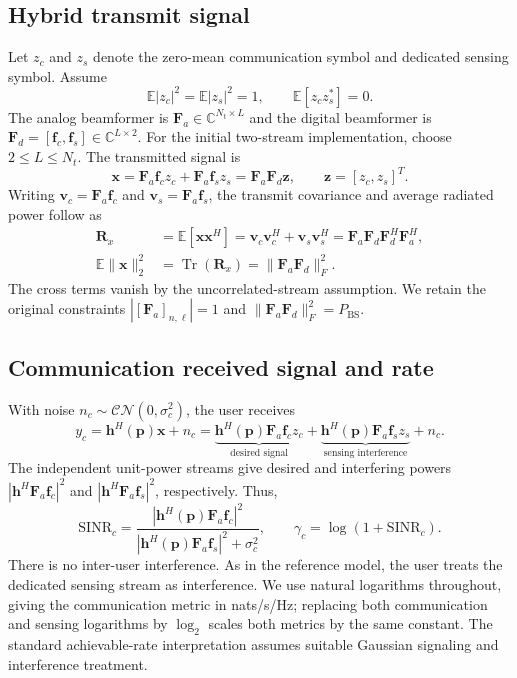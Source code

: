 \documentclass[11pt]{article}
\newcommand{\Fa}{\mathbf F_a}
\newcommand{\Fd}{\mathbf F_d}
\newcommand{\pos}{\mathbf p}
\begin{document}
\subsection{Hybrid transmit signal}
Let $z_c$ and $z_s$ denote the zero-mean communication symbol and dedicated
sensing symbol. Assume
\begin{equation}
 \mathbb E|z_c|^2=\mathbb E|z_s|^2=1,
 \qquad \mathbb E[z_cz_s^*]=0.
\end{equation}
The analog beamformer is $\Fa\in\mathbb C^{N_t\times L}$ and the digital
beamformer is $\Fd=[\mathbf f_c,\mathbf f_s]\in\mathbb C^{L\times2}$.
For the initial two-stream implementation, choose $2\leq L\leq N_t$.
The transmitted signal is
\begin{equation}
 \mathbf x=\Fa\mathbf f_cz_c+\Fa\mathbf f_sz_s
 =\Fa\Fd\mathbf z,\qquad \mathbf z=[z_c,z_s]^T.
 \label{eq:transmit}
\end{equation}
Writing $\mathbf v_c=\Fa\mathbf f_c$ and $\mathbf v_s=\Fa\mathbf f_s$,
the transmit covariance and average radiated power follow as
\begin{align}
 \mathbf R_x&=\mathbb E[\mathbf x\mathbf x^H]
 =\mathbf v_c\mathbf v_c^H+\mathbf v_s\mathbf v_s^H
 =\Fa\Fd\Fd^H\Fa^H,\label{eq:covariance}\\
 \mathbb E\|\mathbf x\|_2^2
 &=\operatorname{Tr}(\mathbf R_x)=\|\Fa\Fd\|_F^2.
 \label{eq:power}
\end{align}
The cross terms vanish by the uncorrelated-stream assumption. We retain the
original constraints $|[\Fa]_{n,\ell}|=1$ and
$\|\Fa\Fd\|_F^2=P_{\mathrm{BS}}$.

\subsection{Communication received signal and rate}
With noise $n_c\sim\mathcal{CN}(0,\sigma_c^2)$, the user receives
\begin{equation}
 y_c=\mathbf h^H(\pos)\mathbf x+n_c
 =\underbrace{\mathbf h^H(\pos)\Fa\mathbf f_cz_c}_{\text{desired signal}}
 +\underbrace{\mathbf h^H(\pos)\Fa\mathbf f_sz_s}_{\text{sensing interference}}
 +n_c.
 \label{eq:commreceived}
\end{equation}
The independent unit-power streams give desired and interfering powers
$|\mathbf h^H\Fa\mathbf f_c|^2$ and $|\mathbf h^H\Fa\mathbf f_s|^2$,
respectively. Thus,
\begin{equation}
 \mathrm{SINR}_c=
 \frac{|\mathbf h^H(\pos)\Fa\mathbf f_c|^2}
 {|\mathbf h^H(\pos)\Fa\mathbf f_s|^2+\sigma_c^2},
 \qquad \gamma_c=\log(1+\mathrm{SINR}_c).
 \label{eq:commsinr}
\end{equation}
There is no inter-user interference. As in the reference model, the user treats
the dedicated sensing stream as interference. We use natural logarithms
throughout, giving the communication metric in nats/s/Hz; replacing both
communication and sensing logarithms by $\log_2$ scales both metrics by the
same constant. The standard achievable-rate interpretation assumes suitable
Gaussian signaling and interference treatment.
\end{document}
